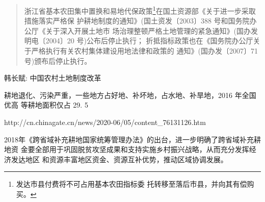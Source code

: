 \begin{quotation}
  浙江省基本农田集中置换和易地代保政策\footnote{发达市县付费将不可占用基本农田指标委
    托转移至落后市县，并向其有偿购买。}在国土资源部《关于进一步采取措施落实严格保
  护耕地制度的通知》(国土资发〔2003〕388 号和国务院办公厅《关于深入开展土地市
  场治理整顿严格土地管理的紧急通知》(国办发明电〔2004〕20 号)公布后停止执行；
  折抵指标政策也在《国务院办公厅关于严格执行有关农村集体建设用地法律和政策的
  通知》(国办发〔2007〕71 号)颁布后停止执行。\cite{wangzhejiang}
\end{quotation}







%


韩长赋: 中国农村土地制度改革

耕地退化、污染严重，一些地方占好地、补坏地，占水地、补旱地，2016 年全国优高
等耕地面积仅占 29. 5%


http://cn.chinagate.cn/news/2020-06/05/content_76131126.htm

2018年《跨省域补充耕地国家统筹管理办法》的出台，进一步明确了跨省域补充耕地资
金要全部用于巩固脱贫攻坚成果和支持实施乡村振兴战略，从而充分发挥经济发达地区
和资源丰富地区资金、资源互补优势，推动区域协调发展。
